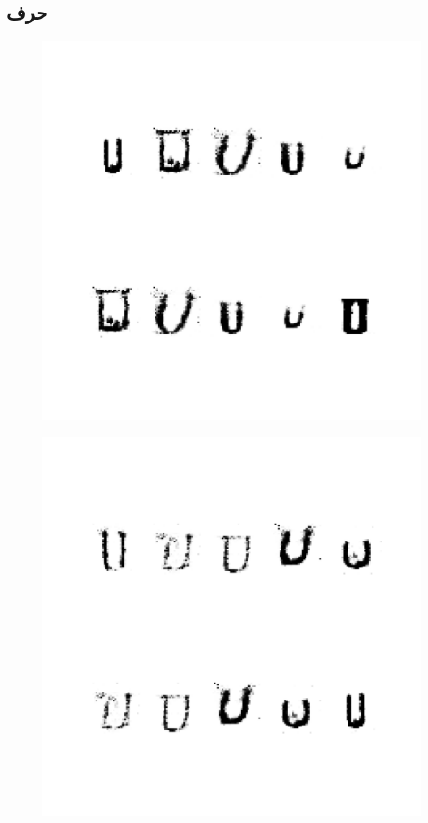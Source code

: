\documentclass{article}
\begin{document}
\subsection{حرف }
\begin{figure}[H]
	\centerline{\includegraphics[width=\textwidth , height=\textheight ]{../results/CGAN_Adam/figs/letters/U/95.pdf}}
\end{figure}
\begin{figure}[H]
	\centerline{\includegraphics[width=\textwidth , height=\textheight ]{../results/CGAN_Adam/figs/letters/U/90.pdf}}
\end{figure}
\end{document}
